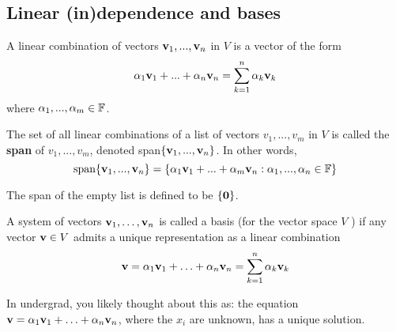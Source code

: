 \documentclass{article}
\begin{document}





\subsection{Linear (in)dependence and bases}

\begin{definition}
A linear combination of vectors ${\mathbf{v}}_{1},...,{\mathbf{v}}_{n}$  in $V$ is a vector of the form 
$$
\alpha_{1}{\mathbf{v}}_{1}+...+\alpha_{n}{\mathbf{v}}_{n} = \sum_{k=1}^n \alpha_k {\mathbf{v}}_k
$$
 where $\alpha_{1},...,\alpha_{m} \in {\mathbb{F}}$.
\end{definition}

\begin{definition}
The set of all linear combinations of a list of vectors
$v_{1},...,v_{m}$ in $V$ is called the \textbf{span} of $v_{1},...,v_{m}$,
denoted span$\{{\mathbf{v}}_{1},...,{\mathbf{v}}_{n}\}$. In other words, 
$$
\text{span}\{{\mathbf{v}}_{1},...,{\mathbf{v}}_{n}\}=\{\alpha_{1}{\mathbf{v}}_{1}+...+\alpha_{m}{\mathbf{v}}_{n} :\alpha_{1},...,\alpha_{n}\in{\mathbb{F}}\}
$$
\end{definition}
The span of the empty list is defined to be $\{{\mathbf{0}}\}$.

\begin{definition}
A system of vectors ${\mathbf{v}}_1, \ldots, {\mathbf{v}}_n$ is called a basis (for the vector space $V$ ) if any vector ${\mathbf{v}} \in V$ admits a unique representation as a linear combination
$$
{\mathbf{v}} = \alpha_1 {\mathbf{v}}_1 + \ldots + \alpha_n {\mathbf{v}}_n = \sum_{k=1}^n \alpha_k {\mathbf{v}}_k
$$
\end{definition}

In undergrad, you likely thought about this as: the equation ${\mathbf{v}} = \alpha_1 {\mathbf{v}}_1 + \ldots + \alpha_n {\mathbf{v}}_n$, where the $x_i$ are unknown, has a unique solution.
\end{document}
